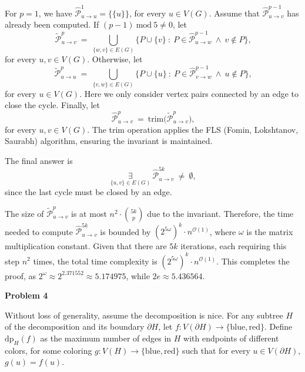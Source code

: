 \documentclass[12pt]{article}
\begin{document}
	For \(p = 1\), we have \(\widehat{\mathcal{P}}_{u \to u}^{1} = \{\{u\}\}\),
	for every \(u \in V(G)\). Assume that
	\(\widehat{\mathcal{P}}_{u \to v}^{p - 1}\) has already been computed. If
	\((p - 1) \ \text{mod} \ 5 \neq 0\), let
	\[ \widetilde{\mathcal{P}}_{u \to v}^{p} \ = \
	\bigcup\limits_{\{w, v\} \in E(G)} \Big\{ P \cup \{v\} \ : \ P \in
	\widehat{\mathcal{P}}_{u \to w}^{p - 1} \ \wedge \ v \notin P \Big\}
	\text{,} \]
	for every \(u, v \in V(G)\). Otherwise, let
	\[ \widetilde{\mathcal{P}}_{u \to u}^{p} \ = \
	\bigcup\limits_{\{v, w\} \in E(G)} \Big\{ P \cup \{u\} \ : \ P \in
	\widehat{\mathcal{P}}_{v \to w}^{p - 1} \ \wedge \ u \notin P \Big\}
	\text{,} \]
	for every \(u \in V(G)\). Here we only consider vertex pairs connected by an
	edge to close the cycle. Finally, let
	\[ \widehat{\mathcal{P}}_{u \to v}^{p} \ = \ \text{trim} \Big(
	\widetilde{\mathcal{P}}_{u \to v}^{p} \Big) \text{,} \]
	for every \(u, v \in V(G)\). The trim operation applies the FLS (Fomin,
	Lokshtanov, Saurabh) algorithm, ensuring the invariant is maintained.
	
	\medskip
	
	The final answer is
	\[ \underset{\{u, v\} \in E(G)}{\exists} \
	\widehat{\mathcal{P}}_{u \to v}^{5k} \ \neq \ \emptyset \text{,} \]
	since the last cycle must be closed by an edge.
	
	\medskip
	
	The size of \(\widetilde{\mathcal{P}}_{u \to v}^{p}\) is at most \(n^{2}
	\cdot \binom{5k}{p}\) due to the invariant. Therefore, the time needed to
	compute \(\widehat{\mathcal{P}}_{u \to v}^{5k}\) is bounded by
	\((2^{5 \omega})^{k} \cdot n^{\mathcal{O}(1)}\), where \(\omega\) is the
	matrix multiplication constant. Given that there are \(5k\) iterations, each
	requiring this step \(n^{2}\) times, the total time complexity is
	\((2^{5 \omega})^{k} \cdot n^{\mathcal{O}(1)}\). This completes the proof,
	as \(2^{\omega} \approx 2^{2.371552} \approx 5.174975\), while \(2e \approx
	5.436564\).
	
	\bigskip
	
	\textbf{Problem 4}
	
	\medskip
	
	Without loss of generality, assume the decomposition is nice. For any
	subtree \(H\) of the decomposition and its boundary \(\partial H\), let \(f
	: V(\partial H) \to \{\text{blue}, \text{red}\}\). Define
	\(\text{dp}_{H}(f)\) as the maximum number of edges in \(H\) with endpoints
	of different colors, for some coloring \(g : V(H) \to \{\text{blue},
	\text{red}\}\) such that for every \(u \in V(\partial H)\), \(g(u) = f(u)\).
	
\end{document}
